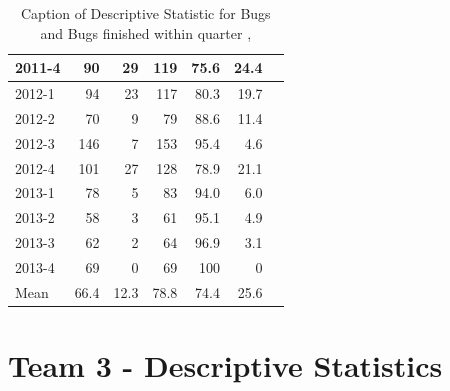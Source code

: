 \documentclass[UKenglish]{ifimaster}  %
\begin{document}
\begin{table}[!htbp]
\begin{adjustwidth}{-2.5cm}{}
{{\begin{tabular}{ | l | r | r | r | r | r | r | }
2011-4 & 90 & 29 & 119 & 75.6 & 24.4 \\ \hline
2012-1 & 94 & 23 & 117 & 80.3 & 19.7 \\ \hline
2012-2 & 70 & 9 & 79 & 88.6 & 11.4\\ \hline
2012-3 & 146 & 7 & 153 & 95.4 & 4.6\\ \hline
2012-4 & 101 & 27 & 128 & 78.9& 21.1 \\ \hline
2013-1 & 78 & 5 & 83 & 94.0 & 6.0 \\ \hline
2013-2 & 58 & 3 & 61 & 95.1 & 4.9 \\ \hline
2013-3 & 62 & 2 & 64 & 96.9 & 3.1 \\ \hline
2013-4 & 69 & 0 & 69 & 100 & 0 \\ \hline
Mean & 66.4&12.3&78.8&74.4&25.6 \\ \hline

\end{tabular}
}
}
\end{adjustwidth}
\caption[Optional caption for list of figures]{Caption of Descriptive Statistic for Bugs and Bugs finished within quarter  , }
\label{DS:2:5} %
\end{table}
 



 \section{Team 3 - Descriptive Statistics}
 
\end{document}
